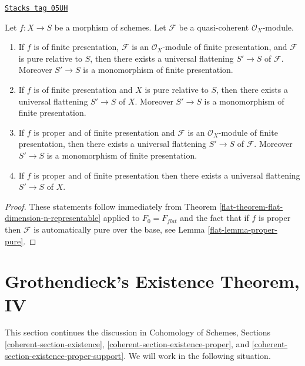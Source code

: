 \begin{lemma}
\label{flat-lemma-when-universal-flattening}
\href{https://stacks.math.columbia.edu/tag/05UH}{\texttt{Stacks tag 05UH}}

Let $f : X \to S$ be a morphism of schemes.
Let $\mathcal{F}$ be a quasi-coherent $\mathcal{O}_X$-module.
\begin{enumerate}
\item If $f$ is of finite presentation, $\mathcal{F}$ is an
$\mathcal{O}_X$-module of finite presentation, and $\mathcal{F}$ is
pure relative to $S$, then there exists a universal flattening
$S' \to S$ of $\mathcal{F}$. Moreover $S' \to S$ is a monomorphism
of finite presentation.
\item If $f$ is of finite presentation and $X$ is pure relative to $S$,
then there exists a universal flattening $S' \to S$ of $X$.
Moreover $S' \to S$ is a monomorphism of finite presentation.
\item If $f$ is proper and of finite presentation and $\mathcal{F}$ is an
$\mathcal{O}_X$-module of finite presentation, then there exists a
universal flattening $S' \to S$ of $\mathcal{F}$. Moreover $S' \to S$ is
a monomorphism of finite presentation.
\item If $f$ is proper and of finite presentation
then there exists a universal flattening $S' \to S$ of $X$.
\end{enumerate}
\end{lemma}

\begin{proof}

These statements follow immediately from
Theorem \ref{flat-theorem-flat-dimension-n-representable}
applied to $F_0 = F_{flat}$
and the fact that if $f$ is proper then $\mathcal{F}$ is automatically
pure over the base, see
Lemma \ref{flat-lemma-proper-pure}.
\end{proof}

\section{Grothendieck's Existence Theorem, IV}
\label{flat-section-existence}
This section continues the discussion in
Cohomology of Schemes, Sections \ref{coherent-section-existence},
\ref{coherent-section-existence-proper}, and
\ref{coherent-section-existence-proper-support}.
We will work in the following situation.

